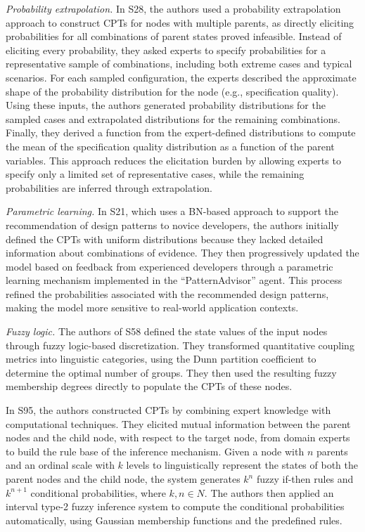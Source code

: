 \textit{Probability extrapolation.} In S28, the authors used a probability extrapolation approach to construct CPTs for nodes with multiple parents, as directly eliciting probabilities for all combinations of parent states proved infeasible. Instead of eliciting every probability, they asked experts to specify probabilities for a representative sample of combinations, including both extreme cases and typical scenarios. For each sampled configuration, the experts described the approximate shape of the probability distribution for the node (e.g., specification quality). Using these inputs, the authors generated probability distributions for the sampled cases and extrapolated distributions for the remaining combinations. Finally, they derived a function from the expert-defined distributions to compute the mean of the specification quality distribution as a function of the parent variables. This approach reduces the elicitation burden by allowing experts to specify only a limited set of representative cases, while the remaining probabilities are inferred through extrapolation.

\textit{Parametric learning.} In S21, which uses a BN-based approach to support the recommendation of design patterns to novice developers, the authors initially defined the CPTs with uniform distributions because they lacked detailed information about combinations of evidence. They then progressively updated the model based on feedback from experienced developers through a parametric learning mechanism implemented in the ``PatternAdvisor'' agent. This process refined the probabilities associated with the recommended design patterns, making the model more sensitive to real-world application contexts.

\textit{Fuzzy logic.} The authors of S58 defined the state values of the input nodes through fuzzy logic-based discretization. They transformed quantitative coupling metrics into linguistic categories, using the Dunn partition coefficient to determine the optimal number of groups. They then used the resulting fuzzy membership degrees directly to populate the CPTs of these nodes.

In S95, the authors constructed CPTs by combining expert knowledge with computational techniques. They elicited mutual information between the parent nodes and the child node, with respect to the target node, from domain experts to build the rule base of the inference mechanism. Given a node with $n$ parents and an ordinal scale with $k$ levels to linguistically represent the states of both the parent nodes and the child node, the system generates $k^{n}$ fuzzy if-then rules and $k^{n+1}$ conditional probabilities, where $k, n \in N$. The authors then applied an interval type-2 fuzzy inference system to compute the conditional probabilities automatically, using Gaussian membership functions and the predefined rules.

